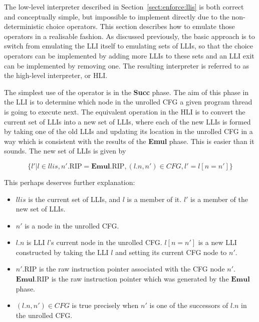 The low-level interpreter described in Section~\ref{sect:enforce:llis}
is both correct and conceptually simple, but impossible to implement
directly due to the non-deterministic choice operators.  This section
describes how to emulate those operators in a realisable fashion.  As
discussed previously, the basic approach is to switch from emulating
the LLI itself to emulating sets of LLIs, so that the choice operators
can be implemented by adding more LLIs to these sets and an LLI exit
can be implemented by removing one.  The resulting interpreter is
referred to as the high-level interpreter, or HLI.

The simplest use of the operator is in the \textbf{Succ} phase.  The
aim of this phase in the LLI is to determine which node in the
unrolled CFG a given program thread is going to execute next.  The
equivalent operation in the HLI is to convert the current set of LLIs
into a new set of LLIs, where each of the new LLIs is formed by taking
one of the old LLIs and updating its location in the unrolled CFG in a
way which is consistent with the results of the \textbf{Emul} phase.
This is easier than it sounds.  The new set of LLIs is given by

\begin{displaymath}
\{l' | l \in \mathit{llis}, n'.\mathrm{RIP} = \mathbf{Emul}.\mathrm{RIP}, (l.n, n') \in \mathit{CFG}, l' = l[n = n'] \}
\end{displaymath}

This perhaps deserves further explanation:

\begin{itemize}
\item $\mathit{llis}$ is the current set of LLIs, and $l$ is a member of it.
  $l'$ is a member of the new set of LLIs.
\item $n'$ is a node in the unrolled CFG.
\item $l.n$ is LLI $l$'s current node in the unrolled CFG.  $l[n =
  n']$ is a new LLI constructed by taking the LLI $l$ and setting its
  current CFG node to $n'$.
\item $n'.\mathrm{RIP}$ is the raw instruction pointer associated with
  the CFG node $n'$.  $\mathbf{Emul}.\mathrm{RIP}$ is the raw
  instruction pointer which was generated by the $\mathbf{Emul}$
  phase.
\item $(l.n, n') \in \mathit{CFG}$ is true precisely when $n'$ is one
  of the successors of $l.n$ in the unrolled CFG.
\end{itemize}

